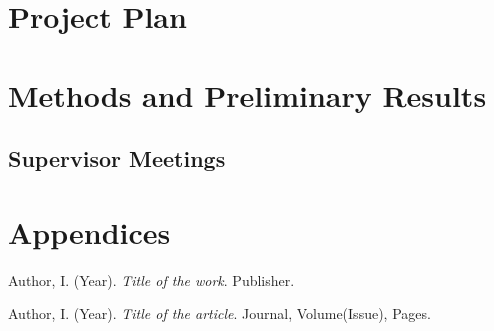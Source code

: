 \documentclass[12pt]{article}
\begin{document}
\section{Project Plan}
\lipsum[6-7]

\section{Methods and Preliminary Results}
\lipsum[8-9]

\subsection{Supervisor Meetings}
\lipsum[10]

\section{Appendices}
\lipsum[11-12]

\begin{thebibliography}{99}

Author, I. (Year). \textit{Title of the work}. Publisher.

Author, I. (Year). \textit{Title of the article}. Journal, Volume(Issue), Pages.

\end{thebibliography}
\end{document}
